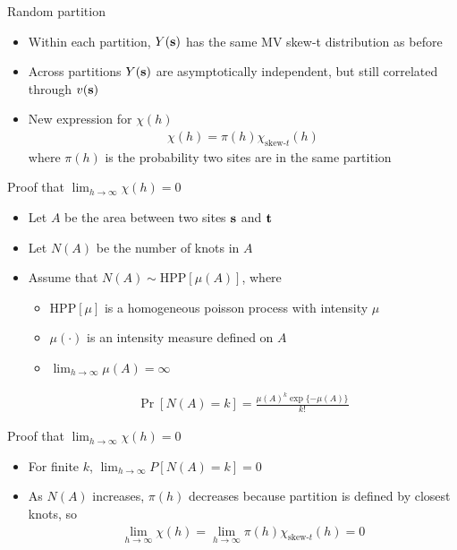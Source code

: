 \documentclass{beamer}
\begin{document}
\begin{frame}{Random partition}
  \begin{itemize} \setlength{\itemsep}{1em}
    \item Within each partition, $Y(\mbox{\bf s})$ has the same MV skew-t distribution as before
    \item Across partitions $Y(\mbox{\bf s})$ are asymptotically independent, but still correlated through $v(\mbox{\bf s})$
    \item New expression for $\chi(h)$
    \begin{align*}
      \chi(h) = \pi(h) \chi_{\text{skew-}t}(h)
    \end{align*}
    where $\pi(h)$ is the probability two sites are in the same partition
  \end{itemize}
\end{frame}

\begin{frame}{Proof that $\lim_{h \rightarrow \infty} \chi(h) = 0$}
  \begin{itemize} \setlength{\itemsep}{1em}
    \item Let $A$ be the area between two sites $\mbox{\bf s}$ and $\mbox{\bf t}$
    \item Let $N(A)$ be the number of knots in $A$
    \item Assume that $N(A) \sim \text{HPP}[\mu(A)]$, where \vspace{0.25em}
    \begin{itemize} \setlength{\itemsep}{0.25em}
      \item HPP$[\mu]$ is a homogeneous poisson process with intensity $\mu$
      \item $\mu(\cdot)$ is an intensity measure defined on $A$
      \item $\lim_{h \rightarrow \infty} \mu(A) = \infty$
    \end{itemize}
    \begin{align*}
      \Pr[N(A) = k] = \frac{ \mu(A)^k \exp\{-\mu(A)\}}{k!}
    \end{align*}
  \end{itemize}
\end{frame}

\begin{frame}{Proof that $\lim_{h \rightarrow \infty} \chi(h) = 0$}
  \begin{itemize} \setlength{\itemsep}{1em}
    \item For finite $k$, $\lim_{h \rightarrow \infty} P[N(A) = k] = 0$
    \item As $N(A)$ increases, $\pi(h)$ decreases because partition is defined by closest knots, so
    \begin{align*}
      \lim_{h \rightarrow \infty} \chi(h) = \lim_{h \rightarrow \infty} \pi(h) \chi_{\text{skew-}t} (h) = 0
    \end{align*}
  \end{itemize}
\end{frame}
\end{document}
